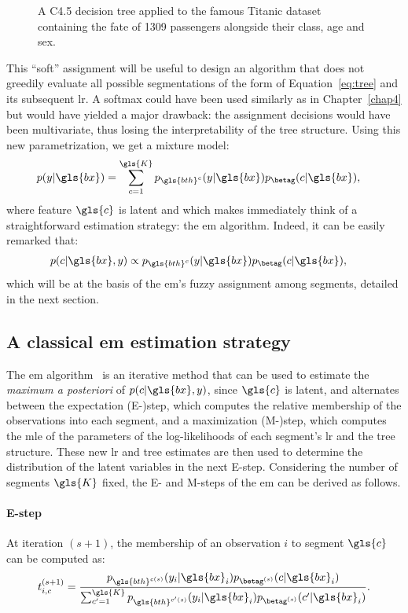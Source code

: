 \begin{figure}
\centering \resizebox{\textwidth}{!}{}
\caption{A C4.5 decision tree applied to the famous Titanic dataset containing the fate of 1309 passengers alongside their class, age and sex.}
\label{fig:titanic_tree}
\end{figure}

This ``soft'' assignment will be useful to design an algorithm that does not greedily evaluate all possible segmentations of the form of Equation~\eqref{eq:tree} and its subsequent \gls{lr}. A softmax could have been used similarly as in Chapter~\ref{chap4} but would have yielded a major drawback: the assignment decisions would have been multivariate, thus losing the interpretability of the tree structure. Using this new parametrization, we get a mixture model:
\begin{align*}
p(y | \gls{bx}) & = \sum_{c = 1}^{\gls{K}} p_{\gls{bth}^c}(y | \gls{bx}) p_{\betag}(c | \gls{bx}),
\end{align*}
where feature $\gls{c}$ is latent and which makes immediately think of a straightforward estimation strategy: the \gls{em} algorithm. Indeed, it can be easily remarked that:
\begin{align*}
p(c | \gls{bx}, y) & \propto p_{\gls{bth}^c}(y | \gls{bx}) p_{\betag}(c | \gls{bx}),
\end{align*}
which will be at the basis of the \gls{em}'s fuzzy assignment among segments, detailed in the next section.

\subsection{A classical \gls{em} estimation strategy}

The \gls{em} algorithm~\cite{dempster1977maximum} is an iterative method that can be used to estimate the \textit{maximum a posteriori} of $p(c | \gls{bx}, y)$, since $\gls{c}$ is latent, and alternates between the expectation (E-)step, which computes the relative membership of the observations into each segment, and a maximization (M-)step, which computes the \gls{mle} of the parameters of the log-likelihoods of each segment's \gls{lr} and the tree structure. These new \gls{lr} and tree estimates are then used to determine the distribution of the latent variables in the next E-step. Considering the number of segments $\gls{K}$ fixed, the E- and M-steps of the \gls{em} can be derived as follows.

\paragraph{E-step}
At iteration $(s+1)$, the membership of an observation $i$ to segment $\gls{c}$ can be computed as:
\[ t_{i,c}^{(s+1)} = \frac{p_{\gls{bth}^{c(s)}}(y_i | \gls{bx}_i) p_{\betag^{(s)}}(c | \gls{bx}_i) }{ \sum_{c'=1}^{\gls{K}} p_{\gls{bth}^{c{'}{(s)}}}(y_i | \gls{bx}_i) p_{\betag^{(s)}}(c{'} | \gls{bx}_i) }.\]

